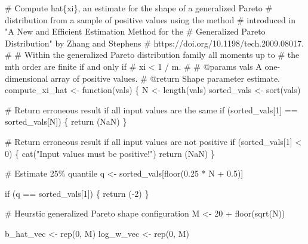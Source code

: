 \documentclass[
  letterpaper,
  DIV=11,
  numbers=noendperiod]{scrartcl}
\newenvironment{Shaded}{\begin{snugshade}}{\end{snugshade}}
\newcommand{\CommentTok}[1]{\textcolor[rgb]{0.37,0.37,0.37}{#1}}
\newcommand{\ControlFlowTok}[1]{\textcolor[rgb]{0.00,0.23,0.31}{#1}}
\newcommand{\DecValTok}[1]{\textcolor[rgb]{0.68,0.00,0.00}{#1}}
\newcommand{\FloatTok}[1]{\textcolor[rgb]{0.68,0.00,0.00}{#1}}
\newcommand{\NormalTok}[1]{\textcolor[rgb]{0.00,0.23,0.31}{#1}}
\newcommand{\OperatorTok}[1]{\textcolor[rgb]{0.37,0.37,0.37}{#1}}
\newcommand{\StringTok}[1]{\textcolor[rgb]{0.13,0.47,0.30}{#1}}
\begin{document}
\begin{Shaded}
\begin{Highlighting}[]
\CommentTok{\# Compute hat\{xi\}, an estimate for the shape of a generalized Pareto }
\CommentTok{\# distribution from a sample of positive values using the method }
\CommentTok{\# introduced in "A New and Efficient Estimation Method for the }
\CommentTok{\# Generalized Pareto Distribution" by Zhang and Stephens }
\CommentTok{\# https://doi.org/10.1198/tech.2009.08017.}
\CommentTok{\# }
\CommentTok{\# Within the generalized Pareto distribution family all moments up to }
\CommentTok{\# the mth order are finite if and only if }
\CommentTok{\#  xi \textless{} 1 / m.}
\CommentTok{\#}
\CommentTok{\# @params vals A one{-}dimensional array of positive values.}
\CommentTok{\# @return Shape parameter estimate.}
\NormalTok{compute\_xi\_hat }\OperatorTok{\textless{}{-}}\NormalTok{ function(vals) \{}
\NormalTok{  N }\OperatorTok{\textless{}{-}}\NormalTok{ length(vals)}
\NormalTok{  sorted\_vals }\OperatorTok{\textless{}{-}}\NormalTok{ sort(vals)}

  \CommentTok{\# Return erroneous result if all input values are the same }
  \ControlFlowTok{if}\NormalTok{ (sorted\_vals[}\DecValTok{1}\NormalTok{] }\OperatorTok{==}\NormalTok{ sorted\_vals[N]) \{}
    \ControlFlowTok{return}\NormalTok{ (NaN)}
\NormalTok{  \}}

  \CommentTok{\# Return erroneous result if all input values are not positive}
  \ControlFlowTok{if}\NormalTok{ (sorted\_vals[}\DecValTok{1}\NormalTok{] }\OperatorTok{\textless{}} \DecValTok{0}\NormalTok{) \{}
\NormalTok{    cat(}\StringTok{"Input values must be positive!"}\NormalTok{)}
    \ControlFlowTok{return}\NormalTok{ (NaN)}
\NormalTok{  \}}

  \CommentTok{\# Estimate 25\% quantile}
\NormalTok{  q }\OperatorTok{\textless{}{-}}\NormalTok{ sorted\_vals[floor(}\FloatTok{0.25} \OperatorTok{*}\NormalTok{ N }\OperatorTok{+} \FloatTok{0.5}\NormalTok{)]}

  \ControlFlowTok{if}\NormalTok{ (q }\OperatorTok{==}\NormalTok{ sorted\_vals[}\DecValTok{1}\NormalTok{]) \{}
    \ControlFlowTok{return}\NormalTok{ (}\OperatorTok{{-}}\DecValTok{2}\NormalTok{)}
\NormalTok{  \}}

  \CommentTok{\# Heurstic generalized Pareto shape configuration}
\NormalTok{  M }\OperatorTok{\textless{}{-}} \DecValTok{20} \OperatorTok{+}\NormalTok{ floor(sqrt(N))}

\NormalTok{  b\_hat\_vec }\OperatorTok{\textless{}{-}}\NormalTok{ rep(}\DecValTok{0}\NormalTok{, M)}
\NormalTok{  log\_w\_vec }\OperatorTok{\textless{}{-}}\NormalTok{ rep(}\DecValTok{0}\NormalTok{, M)}


\end{Highlighting}
\end{Shaded}
\end{document}
